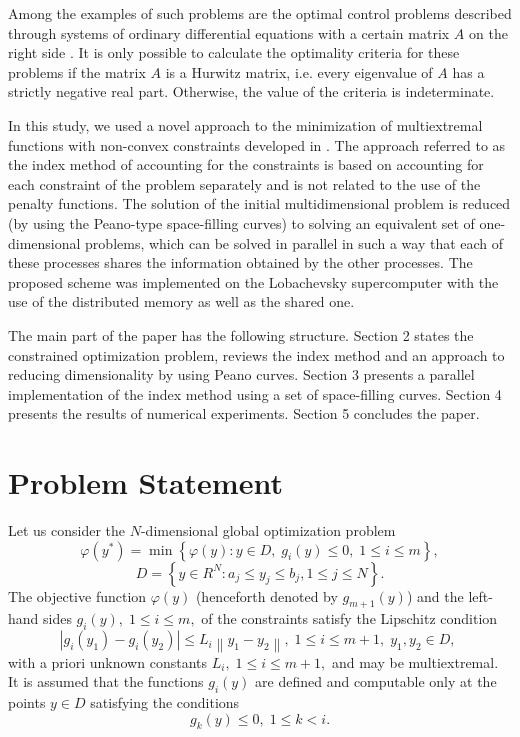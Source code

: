 \documentclass[smallextended]{svjour3}       %
\begin{document}
Among the examples of such problems are the optimal control problems described through systems of ordinary differential equations with a certain matrix $A$ on the right side \cite{Balandin2017}. It is only possible to calculate the optimality criteria for these problems if the matrix $A$ is a Hurwitz matrix, i.e. every eigenvalue of $A$ has a strictly negative real part. Otherwise, the value of the criteria is indeterminate.

In this study, we used a novel approach to the minimization of multiextremal functions with non-convex constraints developed in \cite{Strongin2000,Sergeyev2001,Barkalov2002}. The approach referred to as the index method of accounting for the constraints is based on accounting for each constraint of the problem separately and is not related to the use of the penalty functions. The solution of the initial multidimensional problem is reduced (by using the Peano-type space-filling curves) to solving an equivalent set of one-dimensional problems, which can be solved in parallel in such a way that each of these processes shares the information obtained by the other processes. The proposed scheme was implemented on the Lobachevsky supercomputer with the use of the distributed memory as well as the shared one.

The main part of the paper has the following structure. Section 2 states the constrained optimization problem, reviews the index method and an approach to reducing dimensionality by using Peano curves. Section 3 presents a parallel implementation of the index method using a set of space-filling curves. Section 4 presents the results of numerical experiments. Section 5 concludes the paper.


\section{Problem Statement}
\label{sec:2}

Let us consider the $N$-dimensional global optimization problem
\begin{equation}\label{problem}
\varphi(y^\ast)=\min{\left\{\varphi(y):y\in D, \; g_i(y)\leq 0, \; 1 \leq i \leq m\right\}},
\end{equation}
\begin{equation}\label{D}
D=\left\{y\in R^N: a_j\leq y_j \leq b_j, 1\leq j \leq N \right\}.
\end{equation}
The objective function $\varphi(y)$ (henceforth denoted by $g_{m+1}(y)$) and the left-hand sides $g_i(y), \; 1\leq i \leq m,$ of the constraints satisfy the Lipschitz condition 
\[
\left|g_i(y_1)-g_i(y_2)\right|\leq L_i\left\|y_1-y_2\right\|, \;1\leq i\leq m+1, \; y_1,y_2 \in D,\;
\]
with a priori unknown constants $L_i, \; 1 \leq i \leq m+1,$ and may be multiextremal. It is assumed that the functions $g_i(y)$ are defined and computable only at the points $y \in D$ satisfying the conditions
\begin{equation}\label{g_k}
g_k(y) \leq 0, \; 1 \leq k < i.
\end{equation}
\end{document}

